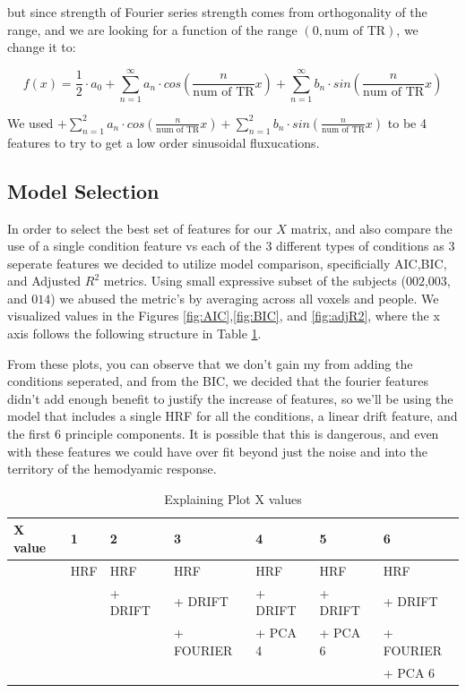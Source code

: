 but since strength of Fourier series strength comes from orthogonality of the range, 
and we are looking for a function of the range $(0, \text{num of TR})$, we change it to:

\begin{equation}
f(x) = \frac{1}{2} \cdot a_0 + \sum_{n=1}^{\infty} a_n \cdot cos(\frac{n}{\text{num of TR}} x) + \sum_{n=1}^{\infty} b_n \cdot sin(\frac{n}{\text{num of TR}} x)
\end{equation}

We used $ + \sum_{n=1}^{2} a_n \cdot cos(\frac{n}{\text{num of TR}} x) + 
\sum_{n=1}^{2} b_n \cdot sin(\frac{n}{\text{num of TR}} x)$ to be 4 features to try 
to get a low order sinusoidal fluxucations.

\subsection{Model Selection}

\par In order to select the best set of features for our $X$ matrix, and also 
compare the use of a single condition feature vs each of the 3 different types
of conditions as 3 seperate features we decided to utilize model comparison, 
specificially AIC,BIC, and Adjusted $R^2$ metrics. Using small expressive
subset of the subjects ($002$,$003$, and $014$) we abused the metric's by
averaging across all voxels and people.  We visualized values in the Figures
\ref{fig:AIC},\ref{fig:BIC}, and \ref{fig:adjR2}, where the x axis follows the 
following structure in Table \ref{tab:plot}.

\par From these plots, you can observe that we don't gain my from adding
the conditions seperated, and from the BIC, we decided that the fourier
features didn't add enough benefit to justify the increase of features, so we'll
be using the model that includes a single HRF for all the conditions, a linear
drift feature, and the first 6 principle components. It is possible that this is dangerous, 
and even with these features we could have over fit beyond just the noise and into 
the territory of the hemodyamic response.

\begin{table}
\centering
	\begin{tabular}{l ||  l   |  l  |   l    | l  | l  |  l}
X value & 1 &        2       &             3       &     4         &        5        &         6       \\
	 \hline
	 & HRF &   HRF       &  HRF            & HRF         &  HRF        & HRF  \\
	 &        &   + DRIFT &  + DRIFT      & + DRIFT  &  + DRIFT   & + DRIFT  \\
	 &        &                 &  + FOURIER &  + PCA 4 &  + PCA 6   & + FOURIER \\
	 &        &                 &                      &                &                   & +  PCA 6 \\
	

	\end{tabular}
\caption{Explaining Plot X values}
\label{tab:plot}
\end{table}


